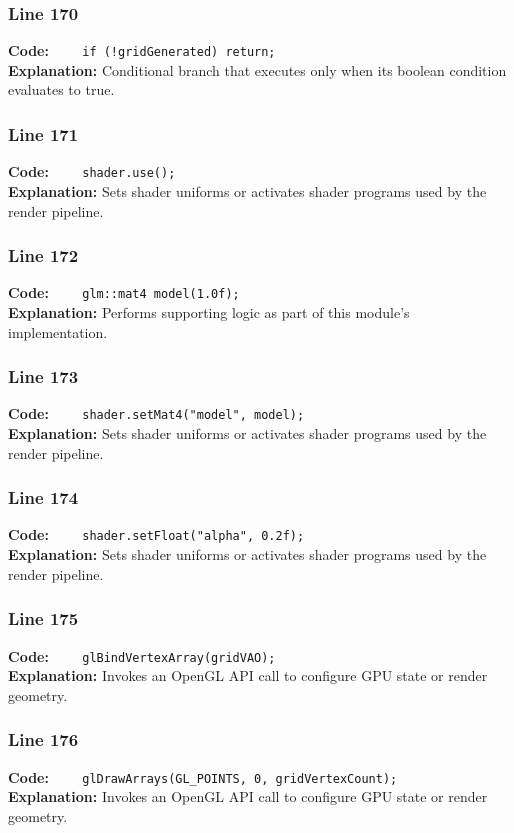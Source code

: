 \documentclass[11pt,a4paper]{article}
\begin{document}
\subsubsection*{Line 170}
\textbf{Code:} \verb|    if (!gridGenerated) return;|\\
\textbf{Explanation:} Conditional branch that executes only when its boolean condition evaluates to true.

\subsubsection*{Line 171}
\textbf{Code:} \verb|    shader.use();|\\
\textbf{Explanation:} Sets shader uniforms or activates shader programs used by the render pipeline.

\subsubsection*{Line 172}
\textbf{Code:} \verb|    glm::mat4 model(1.0f);|\\
\textbf{Explanation:} Performs supporting logic as part of this module's implementation.

\subsubsection*{Line 173}
\textbf{Code:} \verb|    shader.setMat4("model", model);|\\
\textbf{Explanation:} Sets shader uniforms or activates shader programs used by the render pipeline.

\subsubsection*{Line 174}
\textbf{Code:} \verb|    shader.setFloat("alpha", 0.2f);|\\
\textbf{Explanation:} Sets shader uniforms or activates shader programs used by the render pipeline.

\subsubsection*{Line 175}
\textbf{Code:} \verb|    glBindVertexArray(gridVAO);|\\
\textbf{Explanation:} Invokes an OpenGL API call to configure GPU state or render geometry.

\subsubsection*{Line 176}
\textbf{Code:} \verb|    glDrawArrays(GL_POINTS, 0, gridVertexCount);|\\
\textbf{Explanation:} Invokes an OpenGL API call to configure GPU state or render geometry.
\end{document}
